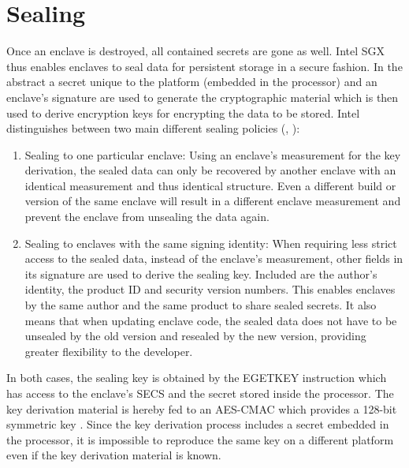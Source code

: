 \section{Sealing}
Once an enclave is destroyed, all contained secrets are gone as well. Intel SGX thus enables enclaves to seal data for persistent storage in a secure fashion. In the abstract a
secret unique to the platform (embedded in the processor) and an enclave's signature are used to generate the cryptographic material which is then used to derive encryption keys
for encrypting the data to be stored. Intel distinguishes between two main different sealing policies (\cite{EnclaveWritersGuide}, \cite{IntelSealing}):
\begin{enumerate}
    \item Sealing to one particular enclave: Using an enclave's measurement for the key derivation, the sealed data can only be recovered by another enclave with an identical
          measurement and thus identical structure. Even a different build or version of the same enclave will result in a different enclave measurement and prevent the enclave
          from unsealing the data again.
    \item Sealing to enclaves with the same signing identity: When requiring less strict access to the sealed data, instead of the enclave's measurement, other fields in its
          signature are used to derive the sealing key. Included are the author's identity, the product ID and security version numbers. This enables enclaves by the same
          author and the same product to share sealed secrets. It also means that when updating enclave code, the sealed data does not have to be unsealed by the old version
          and resealed by the new version, providing greater flexibility to the developer.
\end{enumerate}
In both cases, the sealing key is obtained by the EGETKEY instruction which has access to the enclave's SECS and the secret stored inside the processor. The key derivation material
is hereby fed to an AES-CMAC which provides a 128-bit symmetric key \cite{Costan2016IntelSE}. Since the key derivation process includes a secret embedded in the processor, it is
impossible to reproduce the same key on a different platform even if the key derivation material is known.